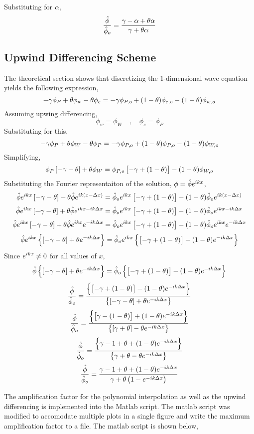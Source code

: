 \documentclass[a4paper, 12pt]{report}
\begin{document}
\begin{center}
Substituting for $\alpha$,
$$\frac{\hat{\phi}}{\hat{\phi}_o} = \frac{\gamma - \alpha + \theta\alpha}{\gamma + \theta\alpha}$$


\subsection{Upwind Differencing Scheme}
The theoretical section shows that discretizing the $1$-dimensional wave equation yields the following expression,
$$-\gamma\phi_{P} + \theta\phi_{w} - \theta\phi_{e} = - \gamma\phi_{P,o} + (1-\theta)\phi_{e,o} - (1-\theta)\phi_{w,o}$$
Assuming upwing differencing,
$$\phi_{w} = \phi_{W} \quad,\quad \phi_{e} = \phi_{P}$$
Substituting for this,
$$-\gamma\phi_{P} + \theta\phi_{W} - \theta\phi_{P} = - \gamma\phi_{P,o} + (1-\theta)\phi_{P,o} - (1-\theta)\phi_{W,o}$$
Simplifying,
$$\phi_{P}\left[-\gamma - \theta\right] + \theta\phi_{W} = \phi_{P,o}\left[-\gamma + (1-\theta)\right] - (1-\theta)\phi_{W,o}$$
Substituting the Fourier representaiton of the solution, $\phi = \hat{\phi}e^{ikx}$,
$$\hat{\phi}e^{ikx}\left[-\gamma - \theta\right] + \theta\hat{\phi}e^{ik(x-\Delta x)} = \hat{\phi}_{o}e^{ikx}\left[-\gamma + (1-\theta)\right] - (1-\theta)\hat{\phi}_{o}e^{ik(x-\Delta x)}$$
$$\hat{\phi}e^{ikx}\left[-\gamma - \theta\right] + \theta\hat{\phi}e^{ikx-ik\Delta x} = \hat{\phi}_{o}e^{ikx}\left[-\gamma + (1-\theta)\right] - (1-\theta)\hat{\phi}_{o}e^{ikx-ik\Delta x}$$
$$\hat{\phi}e^{ikx}\left[-\gamma - \theta\right] + \theta\hat{\phi}e^{ikx}e^{-ik\Delta x} = \hat{\phi}_{o}e^{ikx}\left[-\gamma + (1-\theta)\right] - (1-\theta)\hat{\phi}_{o}e^{ikx}e^{-ik\Delta x}$$
$$\hat{\phi}e^{ikx}\left\{\left[-\gamma - \theta\right] + \theta e^{-ik\Delta x}\right\} = \hat{\phi}_{o}e^{ikx}\left\{\left[-\gamma + (1-\theta)\right] - (1-\theta)e^{-ik\Delta x}\right\}$$
Since $\displaystyle{e^{ikx} \neq 0}$ for all values of $x$,
$$\hat{\phi}\left\{\left[-\gamma - \theta\right] + \theta e^{-ik\Delta x}\right\} = \hat{\phi}_{o}\left\{\left[-\gamma + (1-\theta)\right] - (1-\theta)e^{-ik\Delta x}\right\}$$
$$\frac{\hat{\phi}}{\hat{\phi}_{o}} = \frac{\left\{\left[-\gamma + (1-\theta)\right] - (1-\theta)e^{-ik\Delta x}\right\}}{\left\{\left[-\gamma - \theta\right] + \theta e^{-ik\Delta x}\right\}}$$
$$\frac{\hat{\phi}}{\hat{\phi}_{o}} = \frac{\left\{\left[\gamma - (1-\theta)\right] + (1-\theta)e^{-ik\Delta x}\right\}}{\left\{\left[\gamma + \theta\right] - \theta e^{-ik\Delta x}\right\}}$$
$$\frac{\hat{\phi}}{\hat{\phi}_{o}} = \frac{\left\{\gamma - 1 + \theta + (1-\theta)e^{-ik\Delta x}\right\}}{\left\{\gamma + \theta - \theta e^{-ik\Delta x}\right\}}$$
$$\frac{\hat{\phi}}{\hat{\phi}_{o}} = \frac{\gamma - 1 + \theta + (1-\theta)e^{-ik\Delta x}}{\gamma + \theta\left(1 - e^{-ik\Delta x}\right)}$$

The amplification factor for the polynomial interpolation as well as the upwind differencing is implemented into the Matlab script. The matlab script was modified to accomodate multiple plots in a single figure and write the maximum amplification factor to a file. The matlab script is shown below,



\end{center}
\end{document}
